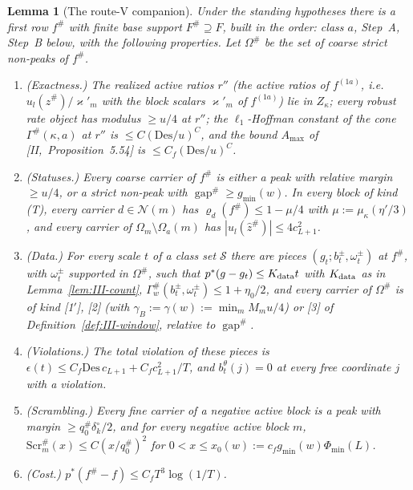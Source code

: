 \documentclass[10pt]{amsart}
\newtheorem{lemma}[theorem]{Lemma}
\theoremstyle{definition}
\theoremstyle{remark}
\newcommand{\gap}{\operatorname{gap}}
\newcommand{\zh}{\hat z}
\begin{document}
\begin{lemma}[The route-V companion]\label{lem:III-CMtr}
Under the standing hypotheses there is a first row $f^\#$ with finite base
support $F^\#\supseteq F$, built in the order: class $a$, Step~A, Step~B
below, with the following properties.  Let $\Omega^\#$ be the set of coarse
strict non-peaks of $f^\#$.
\begin{enumerate}
\item[(a)] \textup{(Exactness.)}  The realized active ratios $r''$ \textup{(}the
active ratios of $f^{(1a)}$, i.e.\ $u_l(\zh^\#)/\varkappa'_m$ with the block
scalars $\varkappa'_m$ of $f^{(1a)}$\textup{)} lie in $Z_\kappa$; every robust
rate object has modulus $\ge u/4$ at $r''$; the
$\ell_1$-Hoffman constant of the cone $\Gamma^\#(\kappa,a)$ at $r''$ is
$\le C(\mathrm{Des}/u)^C$, and the bound $A_{\max}$ of [II,~Proposition~5.54] is
$\le C_f(\mathrm{Des}/u)^C$.
\item[(b)] \textup{(Statuses.)}  Every coarse carrier of $f^\#$ is either a
peak with relative margin $\ge u/4$, or a strict non-peak with $\gap^\#\ge
g_{\min}(w)$.  In every block of kind (T), every carrier $d\in\mathcal N(m)$ has
$\varrho_d(f^\#)\le1-\mu/4$ with $\mu:=\mu_\kappa(\eta'/3)$, and every carrier of
$\Omega_m\setminus\Omega_a(m)$ has $|u_l(\zh^\#)|\le4c_{L+1}^2$.
\item[(c)] \textup{(Data.)}  For every scale $t$ of a class set $\mathcal S$
there are pieces $(g_t;b^\pm_t,\omega^\pm_t)$ at $f^\#$, with
$\omega^\pm_t$ supported in $\Omega^\#$, such that $p^*(g-g_t)\le K_{\rm data}t$
with $K_{\rm data}$ as in Lemma~\textup{\ref{lem:III-count}},
$\Gamma^\#_w(b^\pm_t,\omega^\pm_t)\le1+\eta_0/2$, and every carrier of $\Omega^\#$
is of kind \textup{[1$'$]}, \textup{[2]} \textup{(}with $\gamma_B:=\gamma(w):=
\min_mM_mu/4$\textup{)} or \textup{[3]} of Definition~\textup{\ref{def:III-window}},
relative to $\gap^\#$.
\item[(d)] \textup{(Violations.)}  The total violation of these pieces is
$\epsilon(t)\le C_f\mathrm{Des}\,c_{L+1}+C_fc_{L+1}^2/T$, and $b^\theta_t(j)=0$ at
every free coordinate $j$ with a violation.
\item[(e)] \textup{(Scrambling.)}  Every fine carrier of a negative active
block is a peak with margin $\ge q^\#_0\delta^\circ_k/2$, and for every negative
active block $m$, $\mathrm{Scr}^\#_m(x)\le C(x/q^\#_0)^2$ for $0<x\le x_0(w):=
c_fg_{\min}(w)\Phi_{\min}(L)$.
\item[(f)] \textup{(Cost.)}  $p^*(f^\#-f)\le C_fT^3\log(1/T)$.
\end{enumerate}
\end{lemma}
\end{document}
